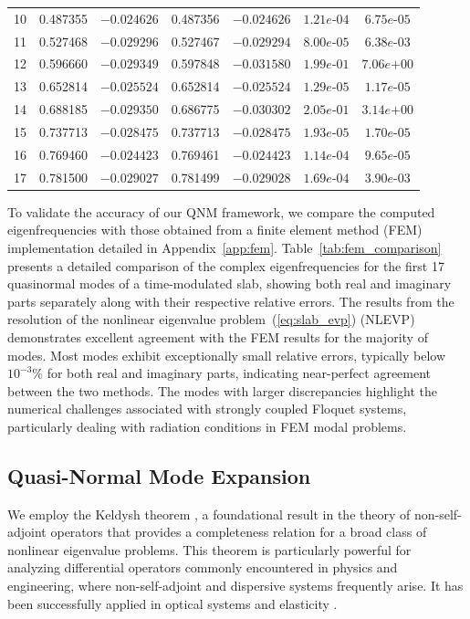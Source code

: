 \documentclass[%
 reprint,
 amsmath,amssymb,
 aps,
 prb,
]{revtex4-2}
\begin{document}
\begin{table}[htbp]
\begin{tabular}{@{}c|cc|cc|cc@{}}
10 & 0.487355 & $-0.024626$ & 0.487356 & $-0.024626$ & $1.21e\text{-}04$ & $6.75e\text{-}05$ \\
11 & 0.527468 & $-0.029296$ & 0.527467 & $-0.029294$ & $8.00e\text{-}05$ & $6.38e\text{-}03$ \\
12 & 0.596660 & $-0.029349$ & 0.597848 & $-0.031580$ & $1.99e\text{-}01$ & $7.06e\text{+}00$ \\
13 & 0.652814 & $-0.025524$ & 0.652814 & $-0.025524$ & $1.29e\text{-}05$ & $1.17e\text{-}05$ \\
14 & 0.688185 & $-0.029350$ & 0.686775 & $-0.030302$ & $2.05e\text{-}01$ & $3.14e\text{+}00$ \\
15 & 0.737713 & $-0.028475$ & 0.737713 & $-0.028475$ & $1.93e\text{-}05$ & $1.70e\text{-}05$ \\
16 & 0.769460 & $-0.024423$ & 0.769461 & $-0.024423$ & $1.14e\text{-}04$ & $9.65e\text{-}05$ \\
17 & 0.781500 & $-0.029027$ & 0.781499 & $-0.029028$ & $1.69e\text{-}04$ & $3.90e\text{-}03$ \\
\hline
\hline
\end{tabular}
\end{table}


To validate the accuracy of our QNM framework, we compare the computed eigenfrequencies with those obtained from a finite element method (FEM) implementation detailed in Appendix~\ref{app:fem}.
Table~\ref{tab:fem_comparison} presents a detailed comparison of the complex eigenfrequencies for the first 17 quasinormal modes of a time-modulated slab, showing both real and imaginary parts separately along with their respective relative errors. The
results from the resolution of  the nonlinear eigenvalue problem~(\ref{eq:slab_evp}) (NLEVP) demonstrates excellent agreement with the FEM results for the majority of modes. Most modes exhibit exceptionally small relative errors, typically below $10^{-3}\%$ for both real and imaginary parts, indicating near-perfect agreement between the two methods. The modes with larger discrepancies highlight the numerical challenges associated with strongly coupled Floquet systems, particularly dealing with radiation conditions in FEM modal problems.


\subsection{Quasi-Normal Mode Expansion}
We employ the Keldysh theorem \cite{keldysh_completeness_1971}, a foundational result in the theory of non-self-adjoint operators that provides a completeness relation for a broad class of nonlinear eigenvalue problems. This theorem is particularly powerful for analyzing differential operators commonly encountered in physics and engineering, where non-self-adjoint and dispersive systems frequently arise. It has been successfully applied in optical systems \cite{zollaPhotonicsHighlyDispersive2018, truongContinuousFamilyExact2020} and elasticity \cite{vial2024a}.
\end{document}
